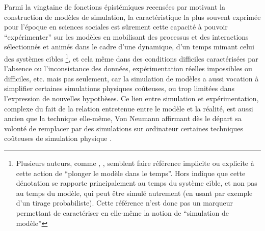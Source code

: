 Parmi la vingtaine de fonctions épistémiques recensées par \textcite[14-23]{Varenne2013} motivant la construction de modèles de simulation, la caractéristique la plus souvent exprimée pour l'époque en sciences sociales est sûrement cette capacité à pouvoir \enquote{expérimenter} sur les modèles en mobilisant des processus et des interactions sélectionnés et animés dans le cadre d'une dynamique, d'un temps mimant celui des systèmes cibles \footnote{Plusieurs auteurs, comme \autocite[462]{Gullahorn1965}, \autocite[296]{Doran1970}, \autocite[294-295]{Batty1976} semblent faire référence implicite ou explicite à cette action de \enquote{plonger le modèle dans le temps}. Hors \autocite[31]{Varenne2013} indique que cette dénotation se rapporte principalement au temps du système cible, et non pas au temps du modèle, qui peut être simulé autrement (en usant par exemple d'un tirage probabiliste). Cette référence n'est donc pas un marqueur permettant de caractériser en elle-même la notion de \enquote{simulation de modèle}}, et cela même dans des conditions difficiles caractérisées par l'absence ou l'inconsistance des données, expérimentation réelles impossibles ou difficiles, etc. mais pas seulement, car la simulation de modèles a aussi vocation à simplifier certaines simulations physiques coûteuses, ou trop limitées dans l'expression de nouvelles hypothèses. Ce lien entre simulation et expérimentation, complexe du fait de la relation entretenue entre le modèle et la réalité, est aussi ancien que la technique elle-même, Von Neumann affirmant dès le départ sa volonté de remplacer par des simulations sur ordinateur certaines techniques coûteuses de simulation physique \autocite[15]{Winsberg2013}.


